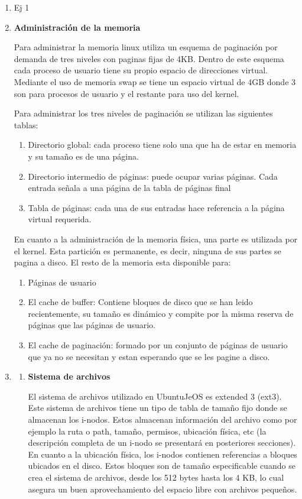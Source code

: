 \documentclass[a4paper,11pt] {article}
\begin{document}
\begin{enumerate}
	\item Ej 1

	\item \textbf{Administraci\'on de la memoria}

	Para administrar la memoria linux utiliza un esquema de paginaci\'on por demanda de tres niveles con paginas fijas de 4KB. Dentro de este esquema cada proceso de usuario tiene su propio espacio de direcciones virtual. Mediante el uso de memoria swap se tiene un espacio virtual de 4GB donde 3 son para procesos de usuario y el restante para uso del kernel.
	
	Para administrar los tres niveles de paginaci\'on se utilizan las siguientes tablas:
		\begin{enumerate}
		\item Directorio global: cada proceso tiene solo una que ha de estar en memoria y su tamaño es de una p\'agina.
		\item Directorio intermedio de p\'aginas: puede ocupar varias p\'aginas. Cada entrada señala a una p\'agina de la tabla de p\'aginas final
		\item Tabla de p\'aginas: cada una de sus entradas hace referencia a la p\'agina virtual requerida.
		\end{enumerate}
	En cuanto a la administraci\'on de la memoria f\'isica, una parte es utilizada por el kernel. Esta partici\'on es permanente, es decir, ninguna de sus partes se pagina a disco.
	El resto de la memoria esta disponible para:
		\begin{enumerate}
		\item P\'aginas de usuario
		\item El cache de buffer: Contiene bloques de disco que se han leido recientemente, su tamaño es din\'amico y compite por la misma reserva de p\'aginas que las p\'aginas de usuario.
		\item El cache de paginaci\'on: formado por un conjunto de p\'aginas de usuario que ya no se necesitan y estan esperando que se les pagine a disco.
		\end{enumerate}

	\item 
		\begin{enumerate}
			\item \textbf{Sistema de archivos} 

			El sistema de archivos utilizado en UbuntuJeOS es extended 3 (ext3). Este sistema de archivos tiene un tipo de tabla de tamaño fijo donde se almacenan los i-nodos. Estos almacenan información del archivo como por ejemplo la ruta o path, tamaño, permisos, ubicación física, etc (la descripción completa de un i-nodo se presentará en posteriores secciones). En cuanto a la ubicación física, los i-nodos contienen referencias a bloques ubicados en el disco. Estos bloques son de tamaño especificable cuando se crea el sistema de archivos, desde los 512 bytes hasta los 4 KB, lo cual asegura un buen aprovechamiento del espacio libre con archivos pequeños.


\end{enumerate}
\end{enumerate}
\end{document}
